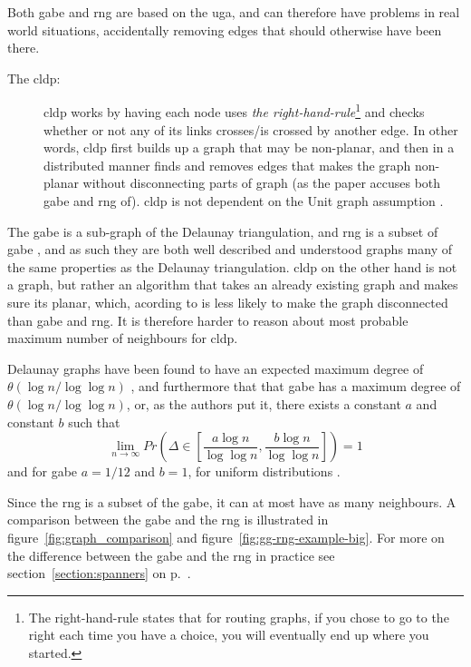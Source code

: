 Both \ac{gabe} and \ac{rng} are based on the \ac{uga}, and can therefore have problems in real world situations, accidentally removing edges that should otherwise have been there\cite{practical}.
\label{right-hand rule}
\begin{description}
\item[The \ac{cldp}:] \ac{cldp} works by having each node uses \emph{the right-hand-rule}\footnote{The right-hand-rule states that for routing graphs, if you chose to go to the right each time you have a choice, you will eventually end up where you started.} and checks whether or not any of its links crosses/is crossed by another edge. In other words, \ac{cldp} first builds up a graph that may be non-planar, and then in a distributed manner finds and removes edges that makes the graph non-planar without disconnecting parts of graph (as the paper accuses both \ac{gabe} and \ac{rng} of). \ac{cldp} is not dependent on the Unit graph assumption \cite{practical}. 
\end{description}

The \ac{gabe} is a sub-graph of the Delaunay triangulation, and \ac{rng} is a subset of \ac{gabe} , and as such they are both well described and understood graphs many of the same properties as the Delaunay triangulation. \ac{cldp} on the other hand is not a graph, but rather an algorithm that takes an already existing graph and makes sure its planar, which, acording to \cite{practical} is less likely to make the graph disconnected than \ac{gabe} and \ac{rng}. It is therefore harder to reason about most probable maximum number of neighbours for \ac{cldp}. 


Delaunay graphs have been found to have an expected maximum degree of $\theta(\log n / \log \log n)$ \cite{delExpected}, and furthermore that that \ac{gabe} has a maximum degree of $\theta(\log n / \log \log n)$, or, as the authors put it, there exists a constant $a$ and constant $b$ such that 
$$
\lim_{n \rightarrow \infty} Pr\left({\Delta \in \left[\frac{a\log n}{\log \log n}, \frac{b\log n}{\log \log n}\right]}\right) = 1
$$
and for \ac{gabe} $a = 1/12$ and $b = 1$, for uniform distributions \cite{GGExpected}.

Since the \ac{rng} is a subset of the \ac{gabe}, it can at most have as many neighbours. A comparison between the \ac{gabe} and the \ac{rng} is illustrated in figure~\ref{fig:graph_comparison} and figure~\ref{fig:gg-rng-example-big}. For more on the difference between the \ac{gabe} and the \ac{rng} in practice see section~\ref{section:spanners} on p.~\pageref{section:spanners}.

